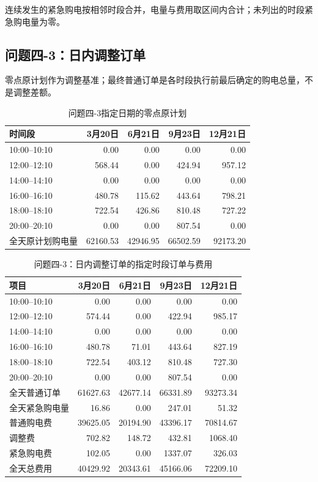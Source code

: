 连续发生的紧急购电按相邻时段合并，电量与费用取区间内合计；未列出的时段紧急购电量为零。

\subsection*{问题四-3：日内调整订单}

零点原计划作为调整基准；最终普通订单是各时段执行前最后确定的购电总量，不是调整差额。

\begin{table}[H]
\centering
\small
{}
\setlength{\tabcolsep}{5pt}
\caption{问题四-3指定日期的零点原计划}
\label{tab:app43_original}
\begin{tabular}{lrrrr}
\toprule
时间段 & 3月20日 & 6月21日 & 9月23日 & 12月21日 \\
\midrule
10:00--10:10 & 0.00 & 0.00 & 0.00 & 0.00 \\
12:00--12:10 & 568.44 & 0.00 & 424.94 & 957.12 \\
14:00--14:10 & 0.00 & 0.00 & 0.00 & 0.00 \\
16:00--16:10 & 480.78 & 115.62 & 443.64 & 798.21 \\
18:00--18:10 & 722.54 & 426.86 & 810.48 & 727.22 \\
20:00--20:10 & 0.00 & 0.00 & 807.54 & 0.00 \\
全天原计划购电量 & 62160.53 & 42946.95 & 66502.59 & 92173.20 \\
\bottomrule
\end{tabular}
\end{table}

\begin{table}[H]
\centering
\small
{}
\setlength{\tabcolsep}{5pt}
\caption{问题四-3：日内调整订单的指定时段订单与费用}
\label{tab:app43_order}
\begin{tabular}{lrrrr}
\toprule
项目 & 3月20日 & 6月21日 & 9月23日 & 12月21日 \\
\midrule
10:00--10:10 & 0.00 & 0.00 & 0.00 & 0.00 \\
12:00--12:10 & 574.44 & 0.00 & 422.94 & 985.17 \\
14:00--14:10 & 0.00 & 0.00 & 0.00 & 0.00 \\
16:00--16:10 & 480.78 & 71.01 & 443.64 & 827.19 \\
18:00--18:10 & 722.54 & 403.12 & 810.48 & 727.30 \\
20:00--20:10 & 0.00 & 0.00 & 807.54 & 0.00 \\
全天普通订单 & 61627.63 & 42677.14 & 66331.89 & 93273.34 \\
全天紧急购电量 & 16.86 & 0.00 & 247.01 & 51.32 \\
普通购电费 & 39625.05 & 20194.90 & 43396.17 & 70814.67 \\
调整费 & 702.82 & 148.72 & 432.81 & 1068.40 \\
紧急购电费 & 102.05 & 0.00 & 1337.07 & 326.03 \\
全天总费用 & 40429.92 & 20343.61 & 45166.06 & 72209.10 \\
\bottomrule
\end{tabular}
\end{table}

